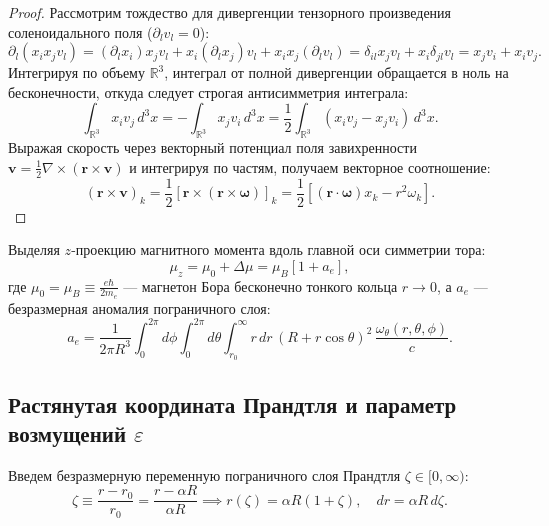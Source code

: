 \documentclass[12pt,a4paper]{article}
\begin{document}
	\begin{proof}
		Рассмотрим тождество для дивергенции тензорного произведения соленоидального поля ($\partial_l v_l = 0$):
		\begin{equation}
			\partial_l (x_i x_j v_l) = (\partial_l x_i) x_j v_l + x_i (\partial_l x_j) v_l + x_i x_j (\partial_l v_l) = \delta_{il} x_j v_l + x_i \delta_{jl} v_l = x_j v_i + x_i v_j.
		\end{equation}
		Интегрируя по объему $\mathbb{R}^3$, интеграл от полной дивергенции обращается в ноль на бесконечности, откуда следует строгая антисимметрия интеграла:
		\begin{equation}
			\int_{\mathbb{R}^3} x_i v_j \, d^3x = -\int_{\mathbb{R}^3} x_j v_i \, d^3x = \frac{1}{2} \int_{\mathbb{R}^3} (x_i v_j - x_j v_i) \, d^3x.
		\end{equation}
		Выражая скорость через векторный потенциал поля завихренности $\mathbf{v} = \frac{1}{2} \nabla \times (\mathbf{r} \times \mathbf{v})$ и интегрируя по частям, получаем векторное соотношение:
		\begin{equation}
			(\mathbf{r} \times \mathbf{v})_k = \frac{1}{2} \left[ \mathbf{r} \times (\mathbf{r} \times \boldsymbol{\omega}) \right]_k = \frac{1}{2} \left[ (\mathbf{r} \cdot \boldsymbol{\omega}) x_k - r^2 \omega_k \right].
		\end{equation}
	\end{proof}
	
	Выделяя $z$-проекцию магнитного момента вдоль главной оси симметрии тора:
	\begin{equation}
		\mu_z = \mu_0 + \Delta \mu = \mu_B \left[ 1 + a_e \right],
	\end{equation}
	где $\mu_0 = \mu_B \equiv \frac{e\hbar}{2m_e}$ --- магнетон Бора бесконечно тонкого кольца $r \to 0$, а $a_e$ --- безразмерная аномалия пограничного слоя:
	\begin{equation}
		a_e = \frac{1}{2\pi R^3} \int_0^{2\pi} d\phi \int_0^{2\pi} d\theta \int_{r_0}^\infty r \, dr \, (R + r \cos\theta)^2 \, \frac{\omega_\theta(r, \theta, \phi)}{c}.
		\label{eq:master_anomaly_integral}
	\end{equation}
	
	\subsection{Растянутая координата Прандтля и параметр возмущений $\varepsilon$}
	Введем безразмерную переменную пограничного слоя Прандтля $\zeta \in [0, \infty)$:
	\begin{equation}
		\zeta \equiv \frac{r - r_0}{r_0} = \frac{r - \alpha R}{\alpha R} \implies r(\zeta) = \alpha R (1 + \zeta), \quad dr = \alpha R \, d\zeta.
	\end{equation}
	
\end{document}
